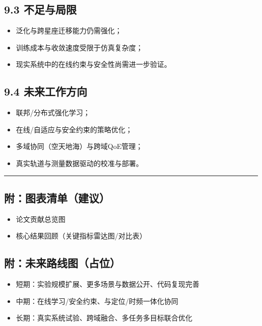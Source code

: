 \subsection{9.3 不足与局限}\label{ux4e0dux8db3ux4e0eux5c40ux9650}

\begin{itemize}
\tightlist
\item
  泛化与跨星座迁移能力仍需强化；
\item
  训练成本与收敛速度受限于仿真复杂度；
\item
  现实系统中的在线约束与安全性尚需进一步验证。
\end{itemize}

\subsection{9.4
未来工作方向}\label{ux672aux6765ux5de5ux4f5cux65b9ux5411}

\begin{itemize}
\tightlist
\item
  联邦/分布式强化学习；
\item
  在线/自适应与安全约束的策略优化；
\item
  多域协同（空天地海）与跨域QoE管理；
\item
  真实轨道与测量数据驱动的校准与部署。
\end{itemize}

\begin{center}\rule{0.5\linewidth}{0.5pt}\end{center}

\subsection{附：图表清单（建议）}\label{ux9644ux56feux8868ux6e05ux5355ux5efaux8bae-6}

\begin{itemize}
\tightlist
\item
  论文贡献总览图
\item
  核心结果回顾（关键指标雷达图/对比表）
\end{itemize}

\subsection{附：未来路线图（占位）}\label{ux9644ux672aux6765ux8defux7ebfux56feux5360ux4f4d}

\begin{itemize}
\tightlist
\item
  短期：实验规模扩展、更多场景与数据公开、代码复现完善
\item
  中期：在线学习/安全约束、与定位/时频一体化协同
\item
  长期：真实系统试验、跨域融合、多任务多目标联合优化
\end{itemize}

